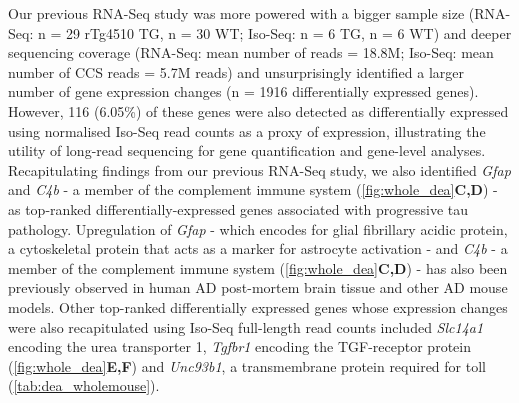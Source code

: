 Our previous RNA-Seq study\cite{Castanho2020} was more powered with a bigger sample size (RNA-Seq: n = 29 rTg4510 TG, n = 30 WT; Iso-Seq: n = 6 TG, n = 6 WT) and deeper sequencing coverage (RNA-Seq: mean number of reads = 18.8M; Iso-Seq: mean number of CCS reads = 5.7M reads) and unsurprisingly identified a larger number of gene expression changes (n = 1916 differentially expressed genes). However, 116 (6.05\%) of these genes were also detected as differentially expressed using normalised Iso-Seq read counts as a proxy of expression, illustrating the utility of long-read sequencing for gene quantification and gene-level analyses. Recapitulating findings from our previous RNA-Seq study, we also identified \textit{Gfap} and \textit{C4b} - a member of the complement immune system (\cref{fig:whole_dea}\textbf{C,D}) - as top-ranked differentially-expressed genes associated with progressive tau pathology. Upregulation of \textit{Gfap} - which encodes for glial fibrillary acidic protein, a cytoskeletal protein that acts as a marker for astrocyte activation - and \textit{C4b} - a member of the complement immune system (\cref{fig:whole_dea}\textbf{C,D}) - has also been previously observed in human AD post-mortem brain tissue and other AD mouse models\cite{Muramori1998,Ishiki2016, Chatterjee2021}. Other top-ranked differentially expressed genes whose expression changes were also recapitulated using Iso-Seq full-length read counts included \textit{Slc14a1}\cite{Castillo2017} encoding the urea transporter 1, \textit{Tgfbr1} encoding the TGF-\textbeta receptor protein (\cref{fig:whole_dea}\textbf{E,F}) and \textit{Unc93b1}\cite{Wirz2013}, a transmembrane protein required for toll (\cref{tab:dea_wholemouse}).

